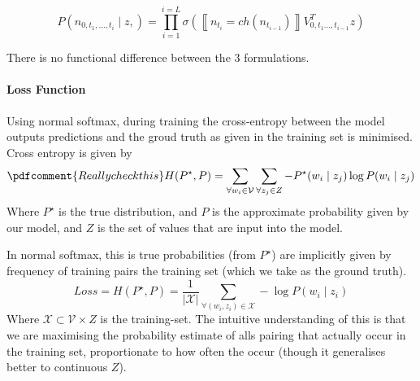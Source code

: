 \documentclass[parskip]{komatufte}
\begin{document}

\begin{equation}
P(n_{0,t_{1},...,t_{i}}\mid z,)=\prod_{i=1}^{i=L}\sigma\left(\left\llbracket n_{t_{i}}=ch(n_{t_{i-1}})\right\rrbracket V_{0,t_{1}...,t_{i-1}}^{T}z\right)
\end{equation}


There is no functional difference between the 3 formulations.

\paragraph{Loss Function}


Using normal softmax, during training the cross-entropy between the model outputs predictions and the groud truth as given in the training set is minimised.
Cross entropy is given by
\begin{equation} \pdfcomment{Really check this}
H(P^\star, P) = \sum_{\forall w_i\in \mathcal{V}} \sum_{\forall z_j \in Z} -P^\star(w_i \mid z_j) \log P(w_i \mid z_j)
\end{equation}
Where $P^\star$ is the true distribution, and $P$ is the approximate probability given by our model,
and $Z$ is the set of values that are input into the model.

In normal softmax, this is true probabilities (from $P^\star$) are implicitly given by frequency of training pairs the training set (which we take as the ground truth).
\begin{equation}
Loss=H(P^\star, P) = \frac{1}{|\mathcal{X}|} \sum_{\forall (w_i, z_i) \in \mathcal{X}} -\log P(w_i \mid z_i)
\end{equation}
Where $\mathcal{X} \subset \mathcal{V} \times Z$ is the training-set.
The intuitive understanding of this is that we are maximising the probability estimate of alls pairing that actually occur in the training set, proportionate to how often the occur (though it generalises better to continuous $Z$).
\end{document}
